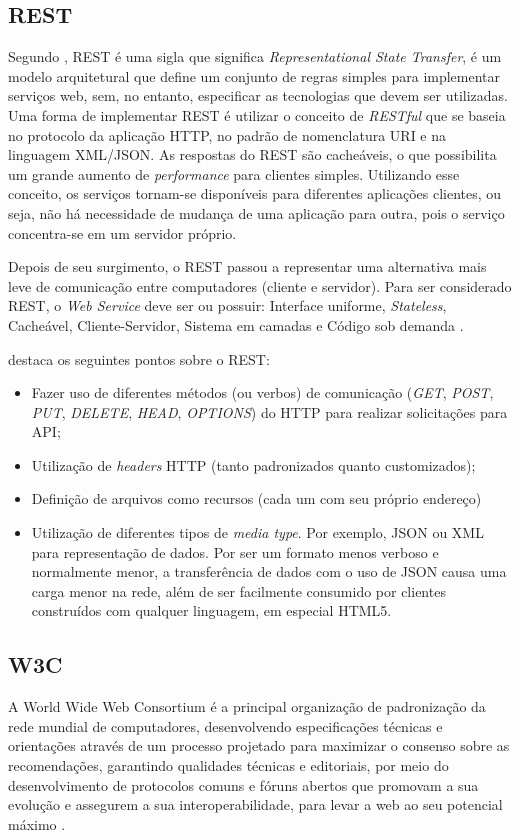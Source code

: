 \newpage
\subsection{REST}
Segundo , REST é uma sigla que significa \textit{Representational State Transfer}, é um modelo arquitetural que define um conjunto de regras simples para implementar serviços web, sem, no entanto, especificar as tecnologias que devem ser utilizadas. Uma forma de implementar REST é utilizar o conceito de \textit{RESTful} que se baseia no protocolo da aplicação HTTP, no padrão de nomenclatura URI e na linguagem XML/JSON. As respostas do REST são cacheáveis, o que possibilita um grande aumento de \textit{performance} para clientes simples. Utilizando esse conceito, os serviços tornam-se disponíveis para diferentes aplicações clientes, ou seja, não há necessidade de mudança de uma aplicação para outra, pois o serviço concentra-se em um servidor próprio. 

Depois de seu surgimento, o REST passou a representar uma alternativa mais leve de comunicação entre computadores (cliente e servidor). Para ser considerado REST, o \textit{Web Service} deve ser ou possuir: Interface uniforme, \textit{Stateless}, Cacheável, Cliente-Servidor, Sistema em camadas e Código sob demanda \cite{rest:roy}. 

 destaca os seguintes pontos sobre o REST:
\begin{itemize}
    \item Fazer uso de diferentes métodos (ou verbos) de comunicação (\textit{GET}, \textit{POST}, \textit{PUT}, \textit{DELETE}, \textit{HEAD}, \textit{OPTIONS}) do HTTP para realizar solicitações para API; 
    \item Utilização de \textit{headers} HTTP (tanto padronizados quanto customizados); 
    \item Definição de arquivos como recursos (cada um com seu próprio endereço)
    \item Utilização de diferentes tipos de \textit{media type}. Por exemplo, JSON ou XML para representação de dados. Por ser um formato menos verboso e normalmente menor, a transferência de dados com o uso de JSON causa uma carga menor na rede, além de ser facilmente consumido por clientes construídos com qualquer linguagem, em especial HTML5.
\end{itemize}

\subsection{W3C}
A World Wide Web Consortium é a principal organização de padronização da rede mundial de computadores, desenvolvendo especificações técnicas e orientações através de um processo projetado para maximizar o consenso sobre as recomendações, garantindo qualidades técnicas e editoriais, por meio do desenvolvimento de protocolos comuns e fóruns abertos que promovam a sua evolução e assegurem a sua interoperabilidade, para levar a web ao seu potencial máximo \cite{api:w3c}.

